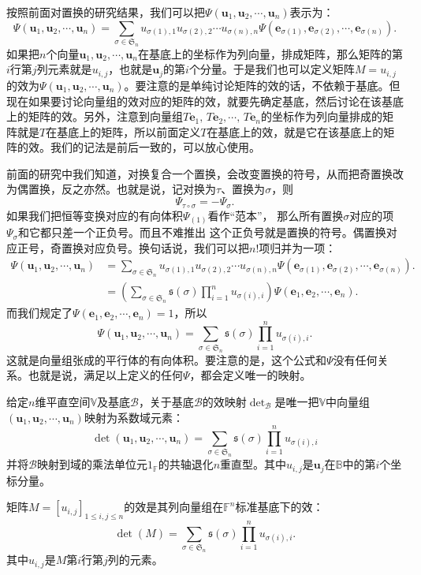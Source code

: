 \documentclass[12pt,UTF8]{ctexbook}
\begin{document}
按照前面对置换的研究结果，我们可以把$\varPsi(\mathbf{u}_1, \mathbf{u}_2,\cdots,\mathbf{u}_n)$表示为：
$$
\varPsi(\mathbf{u}_1, \mathbf{u}_2,\cdots,\mathbf{u}_n) = \sum_{\sigma\in\mathfrak{S}_n} u_{\sigma(1),1}u_{\sigma(2),2}\cdots u_{\sigma(n),n}\varPsi(\mathbf{e}_{\sigma(1)}, \mathbf{e}_{\sigma(2)},\cdots,\mathbf{e}_{\sigma(n)}).
$$
如果把$n$个向量$\mathbf{u}_1, \mathbf{u}_2,\cdots,\mathbf{u}_n$在基底上的坐标作为列向量，排成矩阵，那么矩阵的第$i$行第$j$列元素就是$u_{i,j}$，也就是$\mathbf{u}_j$的第$i$个分量。于是我们也可以定义矩阵$M = u_{i,j}$的效为$\varPsi(\mathbf{u}_1, \mathbf{u}_2,\cdots,\mathbf{u}_n)$。要注意的是单纯讨论矩阵的效的话，不依赖于基底。但现在如果要讨论向量组的效对应的矩阵的效，就要先确定基底，然后讨论在该基底上的矩阵的效。另外，注意到向量组$T\mathbf{e}_1, \,T\mathbf{e}_2,\cdots,\,T\mathbf{e}_n$的坐标作为列向量排成的矩阵就是$T$在基底上的矩阵，所以前面定义$T$在基底上的效，就是它在该基底上的矩阵的效。我们的记法是前后一致的，可以放心使用。

前面的研究中我们知道，对换复合一个置换，会改变置换的符号，从而把奇置换改为偶置换，反之亦然。也就是说，记对换为$\tau$、置换为$\sigma$，则
$$\varPsi_{\tau\circ\sigma} = -\varPsi_{\sigma}.$$
如果我们把恒等变换对应的有向体积$\varPsi_{(1)}$看作“范本”，
那么所有置换$\sigma$对应的项$\varPsi_{\sigma}$和它都只差一个正负号。而且不难推出
这个正负号就是置换的符号。偶置换对应正号，奇置换对应负号。换句话说，我们可以把$n!$项归并为一项：
\begin{align*}
    \varPsi(\mathbf{u}_1, \mathbf{u}_2,\cdots,\mathbf{u}_n) &= \sum_{\sigma\in\mathfrak{S}_n} u_{\sigma(1),1}u_{\sigma(2),2}\cdots u_{\sigma(n),n} \varPsi\left(\mathbf{e}_{\sigma(1)}, \mathbf{e}_{\sigma(2)}, \cdots, \mathbf{e}_{\sigma(n)}\right).  \\
    &= \left(\sum_{\sigma\in\mathfrak{S}_n} \mathfrak{s}(\sigma) \prod_{i=1}^n u_{\sigma(i),i} \right) \varPsi\left(\mathbf{e}_{1}, \mathbf{e}_{2}, \cdots, \mathbf{e}_{n}\right).  
\end{align*}
而我们规定了$\varPsi\left(\mathbf{e}_{1}, \mathbf{e}_{2}, \cdots, \mathbf{e}_{n}\right) = 1$，所以
$$ 
\varPsi(\mathbf{u}_1, \mathbf{u}_2,\cdots,\mathbf{u}_n) = \sum_{\sigma\in\mathfrak{S}_n} \mathfrak{s}(\sigma) \prod_{i=1}^n u_{\sigma(i),i} .
$$
这就是向量组张成的平行体的有向体积。要注意的是，这个公式和$\varPsi$没有任何关系。也就是说，满足以上定义的任何$\varPsi$，都会定义唯一的映射。
\begin{df}\label{df:10_3}
给定$n$维平直空间$\mathbb{V}$及基底$\mathcal{B}$，关于基底$\mathcal{B}$的效映射$\det_\mathcal{B}$是唯一把$\mathbb{V}$中向量组$(\mathbf{u}_1, \mathbf{u}_2,\cdots,\mathbf{u}_n)$映射为系数域元素：
$$
\det(\mathbf{u}_1, \mathbf{u}_2,\cdots,\mathbf{u}_n) = \sum_{\sigma\in\mathfrak{S}_n} \mathfrak{s}(\sigma) \prod_{i=1}^n u_{\sigma(i),i}
$$
并将$\mathcal{B}$映射到域的乘法单位元$1_{\mathbb{F}}$的共轴退化$n$重直型。其中$u_{i,j}$是$\mathbf{u}_j$在$\mathbb{B}$中的第$i$个坐标分量。

矩阵$M = [u_{i,j}]_{1\leqslant i,j\leqslant n}$的效是其列向量组在$\mathbb{F}^n$标准基底下的效：
$$
\det(M) = \sum_{\sigma\in\mathfrak{S}_n} \mathfrak{s}(\sigma) \prod_{i=1}^n u_{\sigma(i),i}.
$$
其中$u_{i,j}$是$M$第$i$行第$j$列的元素。
\end{df}
\end{document}
